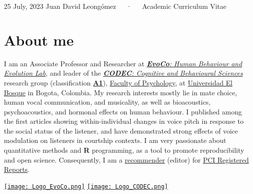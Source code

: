 \documentclass[11pt,a4paper,]{awesome-cv}
\begin{document}
\makecvheader

\makecvfooter
  {25 July, 2023}
    {Juan David Leongómez~~~·~~~Academic Curriculum Vitae}
  {\thepage}





\hypertarget{about-me}{%
\section{About me}\label{about-me}}

\begin{minipage}[c]{0.85\linewidth}
I am an Associate Professor and Researcher at \href{https://jdleongomez.info/en/team/}{\textit{\textbf{EvoCo}: Human Behaviour and Evolution Lab}}, and leader of the \href{https://investigaciones.unbosque.edu.co/codec}{\textit{\textbf{CODEC}: Cognitive and Behavioural Sciences}} research group (classification \href{https://scienti.minciencias.gov.co/gruplac/jsp/visualiza/visualizagr.jsp?nro=00000000001446}{\textbf{A1}}), \href{https://www.uelbosque.edu.co/psicologia}{Faculty of Psychology}, at \href{https://www.uelbosque.edu.co/}{Universidad El Bosque} in Bogota, Colombia. My research interests mostly lie in mate choice, human vocal communication, and musicality, as well as bioacoustics, psychoacoustics, and hormonal effects on human behaviour. I published among the first articles showing within-individual changes in voice pitch in response to the social status of the listener, and have demonstrated strong effects of voice modulation on listeners in courtship contexts. I am very passionate about quantitative methods and \textbf{R} programming, as a tool to promote reproducibility and open science. Consequently, I am a \href{https://rr.peercommunityin.org/about/recommenders}{recommender} (editor) for \href{https://rr.peercommunityin.org/}{PCI Registered Reports}.
\end{minipage} \begin{minipage}[c]{0.15\linewidth}
\begin{flushright} 
\hfill \href{https://jdleongomez.info/en/team/}{\texttt{[image: Logo\_EvoCo.png]}} \newline \href{https://investigaciones.unbosque.edu.co/codec}{\texttt{[image: Logo\_CODEC.png]}}
\end{flushright}
\end{minipage}
\end{document}
